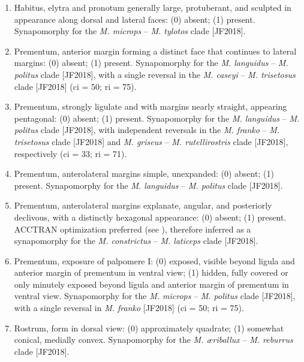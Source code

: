 \documentclass[fleqn,10pt,lineno]{wlpeerj} %
\begin{document}
\begin{enumerate}
	 	\item Habitus, elytra and pronotum generally large, protuberant, and sculpted in appearance along dorsal and lateral faces: (0) absent; (1) present. Synapomorphy for the \textit{M. microps} – \textit{M. tylotos} clade [JF2018].
	 	
	 	\item Prementum, anterior margin forming a distinct face that continues to lateral margins: (0) absent; (1) present. Synapomorphy for the \textit{M. languidus} – \textit{M. politus} clade [JF2018], with a single reversal in the \textit{M. caseyi} – \textit{M. trisetosus} clade [JF2018] (ci = 50; ri = 75).
	 	
	 	\item Prementum, strongly ligulate and with margins nearly straight, appearing pentagonal: (0) absent; (1) present. Synapomorphy for the \textit{M. languidus} – \textit{M. politus} clade [JF2018], with independent reversals in the \textit{M. franko} – \textit{M. trisetosus} clade [JF2018] and \textit{M. griseus} – \textit{M. rutellirostris} clade [JF2018], respectively (ci = 33; ri = 71).
	 	
	 	\item Prementum, anterolateral margins simple, unexpanded: (0) absent; (1) present. Synapomorphy for the \textit{M. languidus} – \textit{M. politus} clade [JF2018].
	 	
	 	\item Prementum, anterolateral margins explanate, angular, and posteriorly declivous, with a distinctly hexagonal appearance: (0) absent; (1) present. ACCTRAN optimization preferred (see \citealt{agnarsson2008}), therefore inferred as a synapomorphy for the \textit{M. constrictus} – \textit{M. laticeps} clade [JF2018].
	 	
	 	\item Prementum, exposure of palpomere I: (0) exposed, visible beyond ligula and anterior margin of prementum in ventral view; (1) hidden, fully covered or only minutely exposed beyond ligula and anterior margin of prementum in ventral view. Synapomorphy for the \textit{M. microps} – \textit{M. politus} clade [JF2018], with a single reversal in \textit{M. franko} [JF2018] (ci = 50; ri = 75).
	 	
	 	\item Rostrum, form in dorsal view: (0) approximately quadrate; (1) somewhat conical, medially convex. Synapomorphy for the \textit{M. {\ae}riballux} – \textit{M. reburrus} clade [JF2018].
	 	

\end{enumerate}
\end{document}
